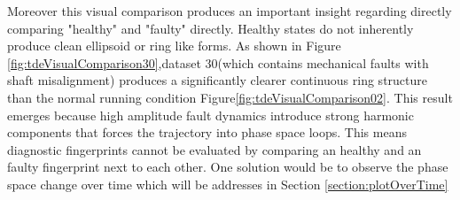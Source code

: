 Moreover this visual comparison produces an important insight regarding directly comparing "healthy" and "faulty" directly. Healthy states do not inherently produce clean  ellipsoid or ring like forms. As shown in Figure \ref{fig:tdeVisualComparison30},dataset 30(which contains mechanical faults with shaft misalignment) produces a significantly clearer continuous ring structure than the normal running condition Figure\ref{fig:tdeVisualComparison02}. This result emerges because high amplitude fault dynamics introduce strong harmonic components that forces the trajectory into phase space loops. This means diagnostic fingerprints cannot be evaluated by comparing an healthy and an faulty fingerprint next to each other. One solution would be to observe the phase space change over time which will be addresses in Section \ref{section:plotOverTime}